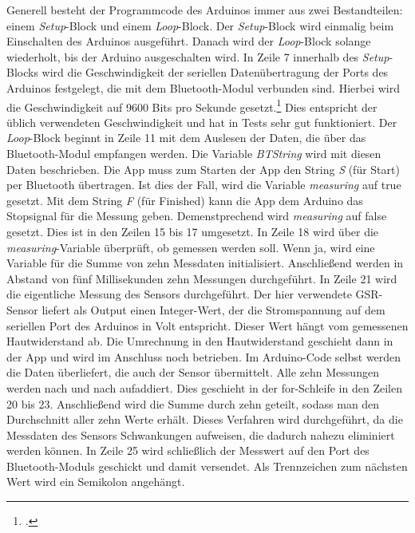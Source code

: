 Generell besteht der Programmcode des Arduinos immer aus zwei Bestandteilen: einem \textit{Setup}-Block und einem \textit{Loop}-Block. Der \textit{Setup}-Block wird einmalig beim Einschalten des Arduinos ausgeführt. Danach wird der \textit{Loop}-Block solange wiederholt, bis der Arduino ausgeschalten wird. 
In Zeile 7 innerhalb des \textit{Setup}-Blocks wird die Geschwindigkeit der seriellen Datenübertragung der Ports des Arduinos festgelegt, die mit dem Bluetooth-Modul verbunden sind. Hierbei wird die Geschwindigkeit auf 9600 Bits pro Sekunde gesetzt.\footcite[Vgl.][]{Ard18b} Dies entspricht der üblich verwendeten Geschwindigkeit und hat in Tests sehr gut funktioniert. \newline
Der \textit{Loop}-Block beginnt in Zeile 11 mit dem Auslesen der Daten, die über das Bluetooth-Modul empfangen werden. Die Variable \textit{BTString} wird mit diesen Daten beschrieben. Die App muss zum Starten der App den String \textit{S} (für Start) per Bluetooth übertragen. Ist dies der Fall, wird die Variable \textit{measuring} auf true gesetzt. Mit dem String \textit{F} (für Finished) kann die App dem Arduino das Stopsignal für die Messung geben. Demenstprechend wird \textit{measuring} auf false gesetzt. Dies ist in den Zeilen 15 bis 17 umgesetzt. \newline
In Zeile 18 wird über die \textit{measuring}-Variable überprüft, ob gemessen werden soll. Wenn ja, wird eine Variable für die Summe von zehn Messdaten initialisiert. Anschließend werden in Abstand von fünf Millisekunden zehn Messungen durchgeführt. In Zeile 21 wird die eigentliche Messung des Sensors durchgeführt. Der hier verwendete GSR-Sensor liefert als Output einen Integer-Wert, der die Stromspannung auf dem seriellen Port des Arduinos in Volt entspricht. Dieser Wert hängt vom gemessenen Hautwiderstand ab. Die Umrechnung in den Hautwiderstand geschieht dann in der App und wird im Anschluss noch betrieben. Im Arduino-Code selbst werden die Daten überliefert, die auch der Sensor übermittelt. Alle zehn Messungen werden nach und nach aufaddiert. Dies geschieht in der for-Schleife in den Zeilen 20 bis 23. Anschließend wird die Summe durch zehn geteilt, sodass man den Durchschnitt aller zehn Werte erhält. Dieses Verfahren wird durchgeführt, da die Messdaten des Sensors Schwankungen aufweisen, die dadurch nahezu eliminiert werden können. In Zeile 25 wird schließlich der Messwert auf den Port des Bluetooth-Moduls geschickt und damit versendet. Als Trennzeichen zum nächsten Wert wird ein Semikolon angehängt. \newline

